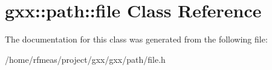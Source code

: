 \hypertarget{classgxx_1_1path_1_1file}{}\section{gxx\+:\+:path\+:\+:file Class Reference}
\label{classgxx_1_1path_1_1file}


The documentation for this class was generated from the following file\+:\begin{DoxyCompactItemize}
\item 
/home/rfmeas/project/gxx/gxx/path/file.\+h\end{DoxyCompactItemize}
